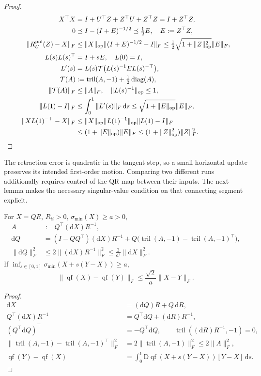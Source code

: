 \begin{proof}
\begin{align}
 X^\top X&=I+U^\top Z+Z^\top U+Z^\top Z=I+Z^\top Z,\\
 0&\preceq I-(I+E)^{-1/2}\preceq\tfrac12 E,\quad E:=Z^\top Z,\\
 \|R_U^{\mathrm{pol}}(Z)-X\|_F
 &\le\|X\|_{\mathrm{op}}\|(I+E)^{-1/2}-I\|_F
 \le\tfrac12\sqrt{1+\|Z\|_{\mathrm{op}}^2}\|E\|_F,\\
 L(s)L(s)^\top&=I+sE,\quad L(0)=I,\\
 L'(s)&=L(s)\mathcal T\bigl(L(s)^{-1}E L(s)^{-\top}\bigr),\\
 \mathcal T(A)&:=\operatorname{tril}(A,-1)+\tfrac12\operatorname{diag}(A),\\
 \|\mathcal T(A)\|_F&\le\|A\|_F,\quad
 \|L(s)^{-1}\|_{\mathrm{op}}\le1,\\
 \|L(1)-I\|_F&\le\int_0^1\|L'(s)\|_F\,\mathrm ds
 \le\sqrt{1+\|E\|_{\mathrm{op}}}\|E\|_F,\\
 \|XL(1)^{-\top}-X\|_F
 &\le\|X\|_{\mathrm{op}}\|L(1)^{-1}\|_{\mathrm{op}}\|L(1)-I\|_F\\
 &\le(1+\|E\|_{\mathrm{op}})\|E\|_F
 \le(1+\|Z\|_{\mathrm{op}}^2)\|Z\|_F^2.
\end{align}
\end{proof}
The retraction error is quadratic in the tangent step, so a small horizontal
update preserves its intended first-order motion. Comparing two different runs
additionally requires control of the QR map between their inputs. The next
lemma makes the necessary singular-value condition on that connecting segment
explicit.

\begin{lemma}\label{lem:rigid-qr-lip}
For $X=QR$, $R_{ii}>0$, $\sigma_{\min}(X)\ge a>0$,
\begin{align}
 A&:=Q^\top(\mathrm dX)R^{-1},\\
 \mathrm dQ&=(I-QQ^\top)(\mathrm dX)R^{-1}
  +Q\bigl(\operatorname{tril}(A,-1)-\operatorname{tril}(A,-1)^\top\bigr),\\
 \|\mathrm dQ\|_F^2&\le2\|(\mathrm dX)R^{-1}\|_F^2
 \le\frac2{a^2}\|\mathrm dX\|_F^2.
\end{align}
If $\inf_{s\in[0,1]}\sigma_{\min}(X+s(Y-X))\ge a$,
\begin{equation}
 \|\operatorname{qf}(X)-\operatorname{qf}(Y)\|_F
 \le\frac{\sqrt2}{a}\|X-Y\|_F.
\end{equation}
\end{lemma}
\begin{proof}
\begin{align}
 \mathrm dX&=(\mathrm dQ)R+Q\,\mathrm dR,\\
 Q^\top(\mathrm dX)R^{-1}&=Q^\top\mathrm dQ+(\mathrm dR)R^{-1},\\
 (Q^\top\mathrm dQ)^\top&=-Q^\top\mathrm dQ,\qquad
 \operatorname{tril}((\mathrm dR)R^{-1},-1)=0,\\
 \|\operatorname{tril}(A,-1)-\operatorname{tril}(A,-1)^\top\|_F^2
 &=2\|\operatorname{tril}(A,-1)\|_F^2\le2\|A\|_F^2,\\
 \operatorname{qf}(Y)-\operatorname{qf}(X)
 &=\int_0^1\mathrm D\operatorname{qf}(X+s(Y-X))[Y-X]\,\mathrm ds.
\end{align}
\end{proof}
